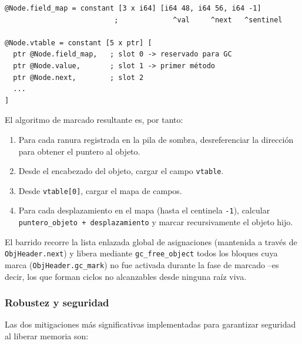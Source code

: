 \documentclass[12pt, a4paper]{article}
\begin{document}
\begin{lstlisting}[language={},caption={Estructura de vtable con mapa de campos en slot 0},
                   label=lst:vtable-fieldmap]
@Node.field_map = constant [3 x i64] [i64 48, i64 56, i64 -1]
                          ;             ^val     ^next   ^sentinel

@Node.vtable = constant [5 x ptr] [
  ptr @Node.field_map,   ; slot 0 -> reservado para GC
  ptr @Node.value,       ; slot 1 -> primer método
  ptr @Node.next,        ; slot 2
  ...
]
\end{lstlisting}

El algoritmo de marcado resultante es, por tanto:

\begin{enumerate}[leftmargin=*, label=\arabic*.]
  \item Para cada ranura registrada en la pila de sombra, desreferenciar la
        dirección para obtener el puntero al objeto.
  \item Desde el encabezado del objeto, cargar el campo \texttt{vtable}.
  \item Desde \texttt{vtable[0]}, cargar el mapa de campos.
  \item Para cada desplazamiento en el mapa (hasta el centinela \texttt{-1}),
        calcular \texttt{puntero\_objeto + desplazamiento} y marcar
        recursivamente el objeto hijo.
\end{enumerate}

El barrido recorre la lista enlazada global de asignaciones (mantenida a través
de \texttt{ObjHeader.next}) y libera mediante \texttt{gc\_free\_object} todos
los bloques cuya marca (\texttt{ObjHeader.gc\_mark}) no fue activada durante
la fase de marcado --es decir, los que forman ciclos no alcanzables desde
ninguna raíz viva.

\subsubsection{Robustez y seguridad}

Las dos mitigaciones más significativas implementadas para garantizar seguridad
al liberar memoria son:
\end{document}

